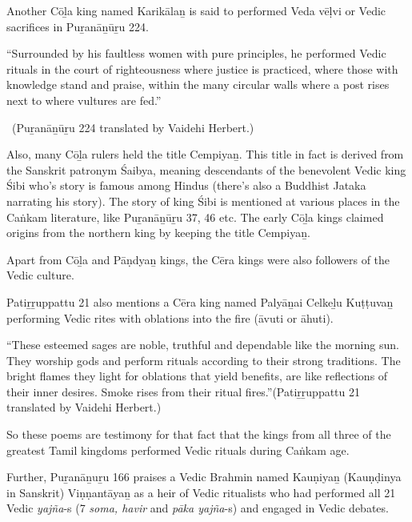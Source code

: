 Another Cōḻa king named Karikālaṉ is said to performed Veda vēḷvi or Vedic sacrifices in Puṟanāṉūṟu 224.

\begin{myquote}
“Surrounded by his faultless women with pure principles, he performed Vedic rituals in the court of righteousness where justice is practiced, where those with knowledge stand and praise, within the many circular walls where a post rises next to where vultures are fed.”

~\hfill (Puṟanāṉūṟu 224 translated by Vaidehi Herbert.)
\end{myquote}

Also, many Cōḻa rulers held the title Cempiyaṉ. This title in fact is derived from the Sanskrit patronym Śaibya, meaning descendants of the benevolent Vedic king Śibi who's story is famous among Hindus (there's also a Buddhist Jataka narrating his story). The story of king Śibi is mentioned at various places in the Caṅkam literature, like Puṟanāṉūṟu 37, 46 etc. The early Cōḻa kings claimed origins from the northern king by keeping the title Cempiyaṉ.

Apart from Cōḻa and Pāṇdyaṉ kings, the Cēra kings were also followers of the Vedic culture.

Patiṟṟuppattu 21 also mentions a Cēra king named Palyāṉai Celkeḻu Kuṭṭuvaṉ performing Vedic rites with oblations into the fire (āvuti or āhuti).

\begin{myquote}
“These esteemed sages are noble, truthful and dependable like the morning sun. They worship gods and perform rituals according to their strong traditions. The bright flames they light for oblations that yield benefits, are like reflections of their inner desires. Smoke rises from their ritual fires.”\hfill (Patiṟṟuppattu 21 translated by Vaidehi Herbert.)
\end{myquote}

So these poems are testimony for that fact that the kings from all three of the greatest Tamil kingdoms performed Vedic rituals during Caṅkam age.

Further, Puṟanāṉuṟu 166 praises a Vedic Brahmin named Kauṇiyaṉ (Kauṇḍinya in Sanskrit) Viṇṇantāyaṉ as a heir of Vedic ritualists who had performed all 21 Vedic \textit{yajña}-s (7 \textit{soma, havir} and \textit{pāka yajña}-s) and engaged in Vedic debates.

